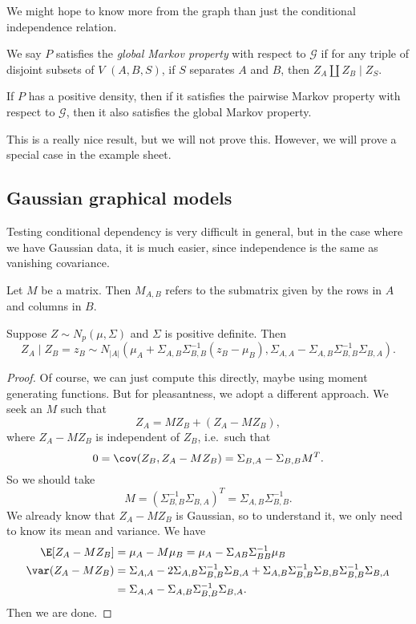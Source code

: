 \documentclass[a4paper]{article}
\begin{document}
We might hope to know more from the graph than just the conditional independence relation.

\begin{defi}
  We say $P$ satisfies the \emph{global Markov property} with respect to $\mathcal{G}$ if for any triple of disjoint subsets of $V$ $(A, B, S)$, if $S$ separates $A$ and $B$, then $Z_A \amalg Z_B \mid Z_S$.
\end{defi}

\begin{prop}
  If $P$ has a positive density, then if it satisfies the pairwise Markov property with respect to $\mathcal{G}$, then it also satisfies the global Markov property.
\end{prop}
This is a really nice result, but we will not prove this. However, we will prove a special case in the example sheet.


\subsection{Gaussian graphical models}
Testing conditional dependency is very difficult in general, but in the case where we have Gaussian data, it is much easier, since independence is the same as vanishing covariance.

\begin{notation}[$M_{A,B}$]
  Let $M$ be a matrix. Then $M_{A,B}$ refers to the submatrix given by the rows in $A$ and columns in $B$.
\end{notation}

\begin{prop}
  Suppose $Z \sim N_p(\mu, \Sigma)$ and $\Sigma$ is positive definite. Then
  \[
    Z_A \mid Z_B = z_B \sim N_{|A|}(\mu_A + \Sigma_{A, B} \Sigma_{B, B}^{-1}(z_B - \mu_B), \Sigma_{A, A} - \Sigma_{A, B} \Sigma_{B, B}^{-1} \Sigma_{B, A}).
  \]
\end{prop}

\begin{proof}
  Of course, we can just compute this directly, maybe using moment generating functions. But for pleasantness, we adopt a different approach. We seek an $M$ such that
  \[
    Z_A = M Z_B + (Z_A - M Z_B),
  \]
  where $Z_A - M Z_B$ is independent of $Z_B$, i.e.\ such that
  \[
    0 = \cov(Z_B, Z_A - M Z_B) = \Sigma_{B,A} - \Sigma_{B, B} M^T.
  \]
  So we should take
  \[
    M = (\Sigma_{B, B}^{-1}\Sigma_{B,A})^T = \Sigma_{A,B} \Sigma_{B,B}^{-1}.
  \]
  We already know that $Z_A - M Z_B$ is Gaussian, so to understand it, we only need to know its mean and variance. We have
  \begin{align*}
    \E[Z_A - M Z_B ] &= \mu_A - M \mu_B = \mu_A - \Sigma_{AB} \Sigma_{BB}^{-1} \mu_B\\
    \var(Z_A - M Z_B) &= \Sigma_{A, A} - 2 \Sigma_{A, B} \Sigma_{B, B}^{-1} \Sigma_{B, A} + \Sigma_{A, B} \Sigma_{B, B}^{-1} \Sigma_{B, B} \Sigma_{B, B}^{-1} \Sigma_{B, A}\\
    &= \Sigma_{A, A} - \Sigma_{A, B} \Sigma_{B, B}^{-1} \Sigma_{B, A}.
  \end{align*}
  Then we are done.
\end{proof}
\end{document}
